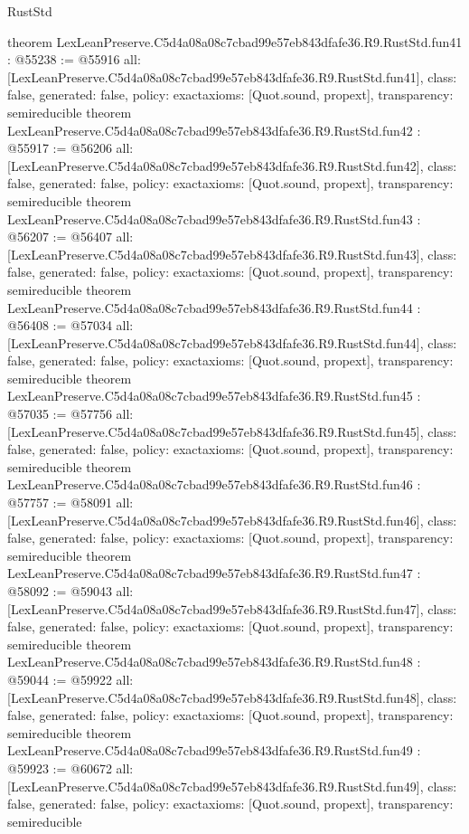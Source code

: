 \begin{lexlean}{RustStd}
\begin{coremodule}
{}
theorem LexLeanPreserve.C5d4a08a08c7cbad99e57eb843dfafe36.R9.RustStd.fun41 : @55238 := @55916 {
  all: [LexLeanPreserve.C5d4a08a08c7cbad99e57eb843dfafe36.R9.RustStd.fun41],
  class: false,
  generated: false,
  policy: exact{axioms: [Quot.sound, propext]},
  transparency: semireducible
}
theorem LexLeanPreserve.C5d4a08a08c7cbad99e57eb843dfafe36.R9.RustStd.fun42 : @55917 := @56206 {
  all: [LexLeanPreserve.C5d4a08a08c7cbad99e57eb843dfafe36.R9.RustStd.fun42],
  class: false,
  generated: false,
  policy: exact{axioms: [Quot.sound, propext]},
  transparency: semireducible
}
theorem LexLeanPreserve.C5d4a08a08c7cbad99e57eb843dfafe36.R9.RustStd.fun43 : @56207 := @56407 {
  all: [LexLeanPreserve.C5d4a08a08c7cbad99e57eb843dfafe36.R9.RustStd.fun43],
  class: false,
  generated: false,
  policy: exact{axioms: [Quot.sound, propext]},
  transparency: semireducible
}
theorem LexLeanPreserve.C5d4a08a08c7cbad99e57eb843dfafe36.R9.RustStd.fun44 : @56408 := @57034 {
  all: [LexLeanPreserve.C5d4a08a08c7cbad99e57eb843dfafe36.R9.RustStd.fun44],
  class: false,
  generated: false,
  policy: exact{axioms: [Quot.sound, propext]},
  transparency: semireducible
}
theorem LexLeanPreserve.C5d4a08a08c7cbad99e57eb843dfafe36.R9.RustStd.fun45 : @57035 := @57756 {
  all: [LexLeanPreserve.C5d4a08a08c7cbad99e57eb843dfafe36.R9.RustStd.fun45],
  class: false,
  generated: false,
  policy: exact{axioms: [Quot.sound, propext]},
  transparency: semireducible
}
theorem LexLeanPreserve.C5d4a08a08c7cbad99e57eb843dfafe36.R9.RustStd.fun46 : @57757 := @58091 {
  all: [LexLeanPreserve.C5d4a08a08c7cbad99e57eb843dfafe36.R9.RustStd.fun46],
  class: false,
  generated: false,
  policy: exact{axioms: [Quot.sound, propext]},
  transparency: semireducible
}
theorem LexLeanPreserve.C5d4a08a08c7cbad99e57eb843dfafe36.R9.RustStd.fun47 : @58092 := @59043 {
  all: [LexLeanPreserve.C5d4a08a08c7cbad99e57eb843dfafe36.R9.RustStd.fun47],
  class: false,
  generated: false,
  policy: exact{axioms: [Quot.sound, propext]},
  transparency: semireducible
}
theorem LexLeanPreserve.C5d4a08a08c7cbad99e57eb843dfafe36.R9.RustStd.fun48 : @59044 := @59922 {
  all: [LexLeanPreserve.C5d4a08a08c7cbad99e57eb843dfafe36.R9.RustStd.fun48],
  class: false,
  generated: false,
  policy: exact{axioms: [Quot.sound, propext]},
  transparency: semireducible
}
theorem LexLeanPreserve.C5d4a08a08c7cbad99e57eb843dfafe36.R9.RustStd.fun49 : @59923 := @60672 {
  all: [LexLeanPreserve.C5d4a08a08c7cbad99e57eb843dfafe36.R9.RustStd.fun49],
  class: false,
  generated: false,
  policy: exact{axioms: [Quot.sound, propext]},
  transparency: semireducible
}
\end{coremodule}
\end{lexlean}
